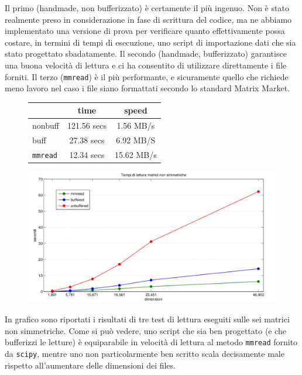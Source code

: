 \documentclass[11pt,a4paper]{scrartcl}
\begin{document}
Il primo (handmade, non bufferizzato) è certamente il più ingenuo. Non è stato realmente preso in considerazione in fase di scrittura del codice, ma ne abbiamo implementato una versione di prova per verificare quanto effettivamente possa costare, in termini di tempi di esecuzione, uno script di importazione dati che sia stato progettato sbadatamente. Il secondo (handmade, bufferizzato) garantisce una buona velocità di lettura e ci ha consentito di utilizzare direttamente i file forniti. Il terzo (\texttt{mmread}) è il più performante, e sicuramente quello che richiede meno lavoro nel caso i file siano formattati secondo lo standard Matrix Market.

\begin{figure}[!ht]
\centering
\begin{tabular}{l|cc}
\toprule
& time & speed \\
\midrule
nonbuff & 121.56 secs & 1.56 MB/s \\
buff & 27.38 secs & 6.92 MB/S \\
\texttt{mmread} & 12.34 secs & 15.62 MB/s \\
\bottomrule
\end{tabular}
\end{figure}

\begin{figure}[!ht]
\centering
\includegraphics[scale=0.52]{images/lettura} 
\end{figure}

In grafico sono riportati i risultati di tre test di lettura eseguiti sulle sei matrici non simmetriche. Come si può vedere, uno script che sia ben progettato (e che bufferizzi le letture) è equiparabile in velocità di lettura al metodo \texttt{mmread} fornito da \texttt{scipy}, mentre uno non particolarmente ben scritto scala decisamente male rispetto all'aumentare delle dimensioni dei files.
\end{document}
